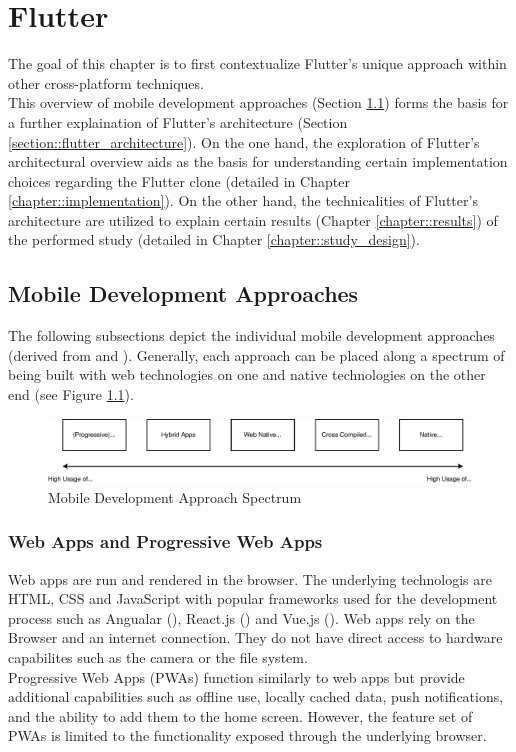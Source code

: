 \chapter{Flutter}
The goal of this chapter is to first contextualize Flutter's unique approach within other cross-platform techniques.\\
This overview of mobile development approaches (Section \ref{section::other_architectures}) forms the basis for a further explaination of Flutter's architecture (Section \ref{section::flutter_architecture}).
On the one hand, the exploration of Flutter's architectural overview aids as the basis for understanding certain implementation choices regarding the Flutter clone (detailed in Chapter \ref{chapter::implementation}).
On the other hand, the technicalities of Flutter's architecture are utilized to explain certain results (Chapter \ref{chapter::results}) of the performed study (detailed in Chapter \ref{chapter::study_design}).

\section{Mobile Development Approaches} \label{section::other_architectures}
The following subsections depict the individual mobile development approaches (derived from \cite{Heitkoetter2013} and \cite{Cunha2018}).
Generally, each approach can be placed along a spectrum of being built with web technologies on one and native technologies on the other end (see Figure \ref{fig::mobile_development_approach_spectrum}).\\
\begin{figure}
    \includegraphics[width=\linewidth]{images/architectures/mobile_development_approaches.eps}
    \caption{Mobile Development Approach Spectrum}
    \label{fig::mobile_development_approach_spectrum}
\end{figure}


\subsection{Web Apps and Progressive Web Apps}
Web apps are run and rendered in the browser. The underlying technologis are HTML, CSS and JavaScript with popular frameworks 
used for the development process such as Angualar (\cite{Angular2021}), React.js (\cite{React2021}) and Vue.js (\cite{Vue2021}). Web apps rely on the Browser and an internet connection.
They do not have direct access to hardware capabilites such as the camera or the file system.\\
Progressive Web Apps (PWAs) function similarly to web apps but provide additional capabilities such as offline use, locally cached data, 
push notifications, and the ability to add them to the home screen. However, the feature set of PWAs is limited to the functionality exposed through the underlying browser.

